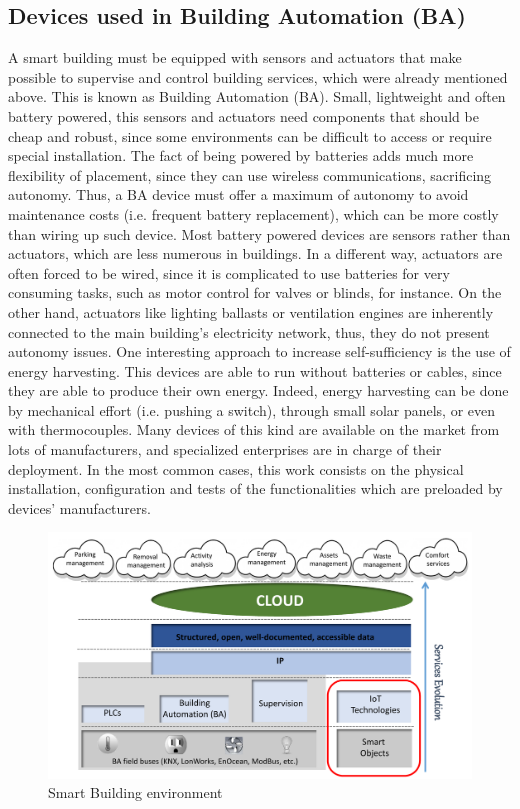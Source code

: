 \subsection{Devices used in Building Automation (BA)}
\label{subsec:Devices4BA}
A smart building must be equipped with sensors and actuators that make possible to supervise and control building services, which were already mentioned above.
This is known as Building Automation (BA).
Small, lightweight and often battery powered, this sensors and actuators need components that should be cheap and robust, since some environments can be difficult to access or require special installation\cite{younis2008placement}.
The fact of being powered by batteries adds much more flexibility of placement, since they can use wireless communications, sacrificing autonomy.
Thus, a BA device must offer a maximum of autonomy to avoid maintenance costs (i.e. frequent battery replacement), which can be more costly than wiring up such device.
Most battery powered devices are sensors rather than actuators, which are less numerous in buildings.
In a different way, actuators are often forced to be wired, since it is complicated to use batteries for very consuming tasks, such as motor control for valves or blinds, for instance.
On the other hand, actuators like lighting ballasts or ventilation engines are inherently connected to the main building's electricity network, thus, they do not present autonomy issues.
One interesting approach to increase self-sufficiency is the use of energy harvesting\cite{grassl2006energy}.
This devices are able to run without batteries or cables, since they are able to produce their own energy.
Indeed, energy harvesting can be done by mechanical effort (i.e. pushing a switch), through small solar panels, or even with thermocouples.
Many devices of this kind are available on the market from lots of manufacturers, and specialized enterprises are in charge of their deployment.
In the most common cases, this work consists on the physical installation, configuration and tests of the functionalities which are preloaded by devices' manufacturers.

\begin{figure}[htb]
	\centering
	\includegraphics[width=1\columnwidth]{chapters/background.images/SmartServices.pdf}
	\caption{Smart Building environment}
	\label{fig:SmartServices}
\end{figure}

